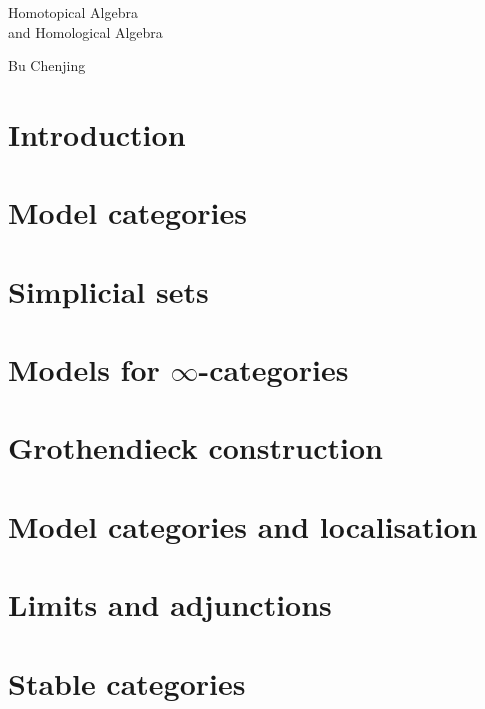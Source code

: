 \documentclass{article}
\begin{document}
\noindent
{\LARGE Homotopical Algebra\\[3pt]and Homological Algebra}
\vspace{20pt}

\noindent
Bu Chenjing
\vspace{40pt}

\section{Introduction}



\section{Model categories}



\section{Simplicial sets}



\section{Models for \texorpdfstring{$\infty$}{∞}-categories}



\section{Grothendieck construction}



\section{Model categories and localisation}



\section{Limits and adjunctions}



\section{Stable categories}


\end{document}
